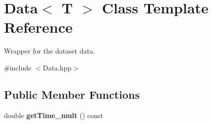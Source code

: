 \hypertarget{class_data}{}\section{Data$<$ T $>$ Class Template Reference}
\label{class_data}


Wrapper for the dataset data.  




{\ttfamily \#include $<$Data.\+hpp$>$}

\subsection*{Public Member Functions}
\begin{DoxyCompactItemize}
\item 
double {\bfseries get\+Time\+\_\+mult} () const \hypertarget{class_data_af45b1061a1c82f5537d3e39a31aca9ee}{}\label{class_data_af45b1061a1c82f5537d3e39a31aca9ee}


\end{DoxyCompactItemize}
